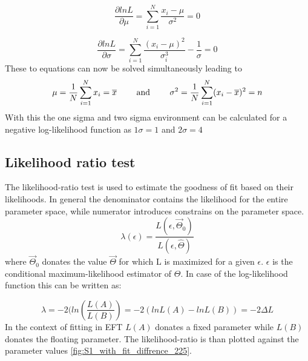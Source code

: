 \documentclass[../Bachelorarbeit.tex]{subfiles}
\begin{document}
\begin{equation}
    \frac{\partial ln L}{\partial \mu} = \sum_{i = 1}^{N} \frac{x_{i}-\mu}{\sigma^{2}} = 0
\end{equation}

\begin{equation}
    \frac{\partial ln L}{\partial \sigma} = \sum_{i = 1}^{N} \frac{(x_{i}-\mu)^{2}}{\sigma_{i}^{3}} - \frac{1}{\sigma} = 0
\end{equation}
These to equations can now be solved simultaneously leading to
\begin{equation}
    \mu = \frac{1}{N} \sum^{N}_{i = 1} x_{i} = \overline{x} \qquad \textnormal{ and } \qquad \sigma^{2} = \frac{1}{N} \sum^{N}_{i = 1} (x_{i}-\overline{x})^{2} = n
\end{equation}
With this the one sigma and two sigma environment can be calculated for a negative log-likelihood function as $1\sigma=1$ and $2\sigma=4$ \cite{Maritn erdman}
\subsection{Likelihood ratio test}
The likelihood-ratio test is used to estimate the goodness of fit based on their likelihoods. In general the denominator contains the likelihood for the entire parameter space, while numerator introduces constrains on the parameter space.
\begin{equation}
    \lambda(\epsilon) = \frac{L(\epsilon,\overrightarrow{\Theta}_{0})}{L(\epsilon,\hat{\Theta})}
\end{equation}
where $\overrightarrow{\Theta}_{0}$ donates the value $\overrightarrow{\Theta}$ for which L is maximized for a given $\epsilon$. $\epsilon$ is the
conditional maximum-likelihood estimator of $\Theta$. In case of the log-likelihood function this can be written as:

\begin{equation}
    \lambda = -2(ln(\frac{L(A)}{L(B)})= -2(ln L(A)-ln L(B))=-2 \Delta L
\end{equation}
In the context of fitting in EFT $L(A)$ donates a fixed parameter while $L(B)$ donates the floating parameter. The likelihood-ratio is than plotted against the parameter values  \ref{fig:S1_with_fit_diffrence_225}.
\end{document}
